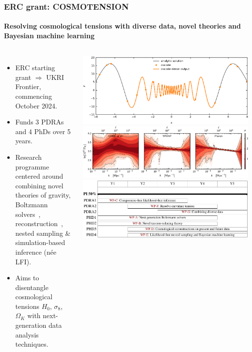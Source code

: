 \documentclass[aspectratio=169, handout]{beamer}
\begin{document}
\begin{frame}
    \frametitle{ERC grant: COSMOTENSION \hspace{95pt}\small {}}
    \framesubtitle{Resolving cosmological tensions with diverse data, novel theories and Bayesian machine learning}

    \begin{columns}
        \begin{itemize}
            \item ERC starting grant $\Rightarrow$ UKRI Frontier, commencing October 2024.
            \item Funds 3 PDRAs and 4 PhDs over 5 years.
            \item Research programme centered around combining novel theories of gravity, Boltzmann solvers~, reconstruction~, nested sampling \& simulation-based inference (n\'{e}e LFI).
            \item Aims to disentangle cosmological tensions $H_0$, $\sigma_8$, $\Omega_K$ with next-generation data analysis techniques.
        \end{itemize}
        \includegraphics[width=\textwidth]{figures/denseoutput.pdf}
        \includegraphics[width=\textwidth]{figures/pps.pdf}
        \includegraphics[width=\textwidth]{figures/gantt.pdf}
    \end{columns}

\end{frame}
\end{document}
